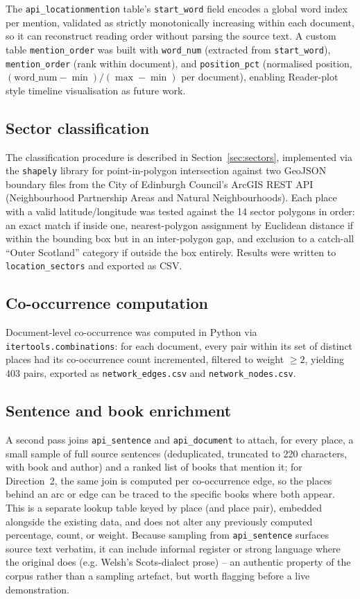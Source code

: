 \documentclass[logo,msc]{infthesis}
\begin{document}
The \texttt{api\_locationmention} table's \texttt{start\_word} field encodes a global word index per mention, validated as strictly monotonically increasing within each document, so it can reconstruct reading order without parsing the source text. A custom table \texttt{mention\_order} was built with \texttt{word\_num} (extracted from \texttt{start\_word}), \texttt{mention\_order} (rank within document), and \texttt{position\_pct} (normalised position, $(\text{word\_num}-\min)/(\max-\min)$ per document), enabling Reader-plot style timeline visualisation as future work.

\subsection*{Sector classification}

The classification procedure is described in Section~\ref{sec:sectors}, implemented via the \texttt{shapely} library for point-in-polygon intersection against two GeoJSON boundary files from the City of Edinburgh Council's ArcGIS REST API (Neighbourhood Partnership Areas and Natural Neighbourhoods). Each place with a valid latitude/longitude was tested against the 14 sector polygons in order: an exact match if inside one, nearest-polygon assignment by Euclidean distance if within the bounding box but in an inter-polygon gap, and exclusion to a catch-all ``Outer Scotland'' category if outside the box entirely. Results were written to \texttt{location\_sectors} and exported as CSV.

\subsection*{Co-occurrence computation}

Document-level co-occurrence was computed in Python via \texttt{itertools.combinations}: for each document, every pair within its set of distinct places had its co-occurrence count incremented, filtered to weight $\geq 2$, yielding 403 pairs, exported as \texttt{network\_edges.csv} and \texttt{network\_nodes.csv}.

\subsection*{Sentence and book enrichment}

A second pass joins \texttt{api\_sentence} and \texttt{api\_document} to attach, for every place, a small sample of full source sentences (deduplicated, truncated to 220 characters, with book and author) and a ranked list of books that mention it; for Direction~2, the same join is computed per co-occurrence edge, so the places behind an arc or edge can be traced to the specific books where both appear. This is a separate lookup table keyed by place (and place pair), embedded alongside the existing data, and does not alter any previously computed percentage, count, or weight. Because sampling from \texttt{api\_sentence} surfaces source text verbatim, it can include informal register or strong language where the original does (e.g. Welsh's Scots-dialect prose) -- an authentic property of the corpus rather than a sampling artefact, but worth flagging before a live demonstration.
\end{document}
